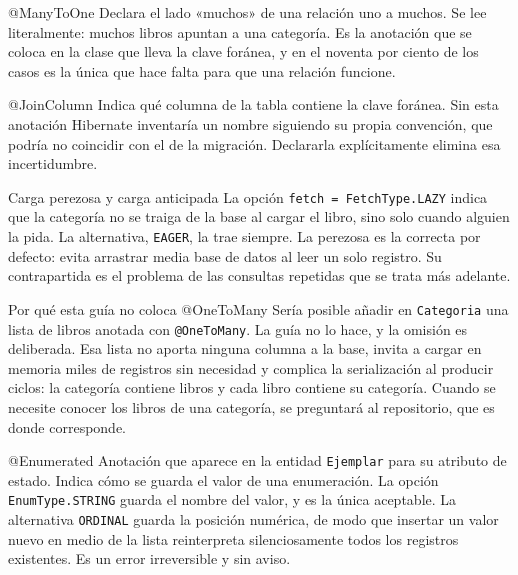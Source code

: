 \documentclass[11pt,a4paper,openany]{book}
\begin{document}
\begin{cajadefinicion}{@ManyToOne}
	Declara el lado «muchos» de una relación uno a muchos. Se lee literalmente: muchos libros apuntan a una categoría. Es la anotación que se coloca en la clase que lleva la clave foránea, y en el noventa por ciento de los casos es la única que hace falta para que una relación funcione.
\end{cajadefinicion}

\begin{cajadefinicion}{@JoinColumn}
	Indica qué columna de la tabla contiene la clave foránea. Sin esta anotación Hibernate inventaría un nombre siguiendo su propia convención, que podría no coincidir con el de la migración. Declararla explícitamente elimina esa incertidumbre.
\end{cajadefinicion}

\begin{cajadefinicion}{Carga perezosa y carga anticipada}
	La opción \texttt{fetch = FetchType.LAZY} indica que la categoría no se traiga de la base al cargar el libro, sino solo cuando alguien la pida. La alternativa, \texttt{EAGER}, la trae siempre. La perezosa es la correcta por defecto: evita arrastrar media base de datos al leer un solo registro. Su contrapartida es el problema de las consultas repetidas que se trata más adelante.
\end{cajadefinicion}

\begin{cajaadvertencia}{Por qué esta guía no coloca @OneToMany}
	Sería posible añadir en \texttt{Categoria} una lista de libros anotada con \texttt{@OneToMany}. La guía no lo hace, y la omisión es deliberada. Esa lista no aporta ninguna columna a la base, invita a cargar en memoria miles de registros sin necesidad y complica la serialización al producir ciclos: la categoría contiene libros y cada libro contiene su categoría. Cuando se necesite conocer los libros de una categoría, se preguntará al repositorio, que es donde corresponde.
\end{cajaadvertencia}

\begin{cajadefinicion}{@Enumerated}
	Anotación que aparece en la entidad \texttt{Ejemplar} para su atributo de estado. Indica cómo se guarda el valor de una enumeración. La opción \texttt{EnumType.STRING} guarda el nombre del valor, y es la única aceptable. La alternativa \texttt{ORDINAL} guarda la posición numérica, de modo que insertar un valor nuevo en medio de la lista reinterpreta silenciosamente todos los registros existentes. Es un error irreversible y sin aviso.
\end{cajadefinicion}
\end{document}

